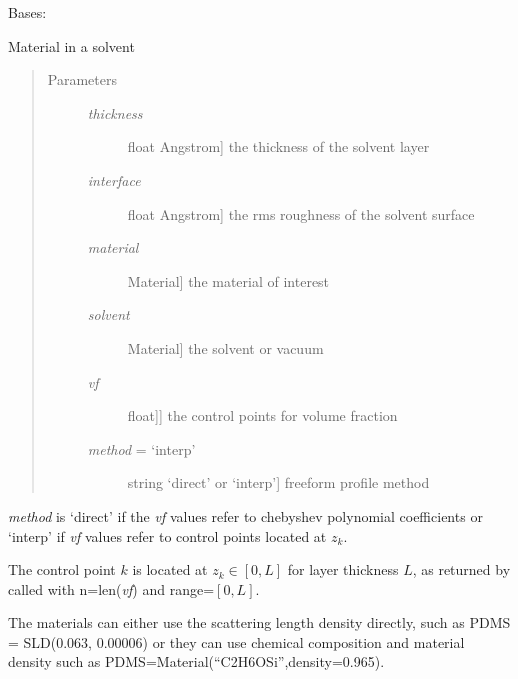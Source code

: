 \documentclass[letterpaper,10pt,english]{sphinxmanual}
\begin{document}
\begin{fulllineitems}
\label{api/cheby:refl1d.cheby.ChebyVF}
Bases: {\hyperref[api/model:refl1d.model.Layer]{}}

Material in a solvent
\begin{quote}\begin{description}
\item[{Parameters }] \leavevmode\begin{description}
\item[{\emph{thickness}}] \leavevmode{[}float \textbar{} Angstrom{]}
the thickness of the solvent layer

\item[{\emph{interface}}] \leavevmode{[}float \textbar{} Angstrom{]}
the rms roughness of the solvent surface

\item[{\emph{material}}] \leavevmode{[}Material{]}
the material of interest

\item[{\emph{solvent}}] \leavevmode{[}Material{]}
the solvent or vacuum

\item[{\emph{vf}}] \leavevmode{[}{[}float{]}{]}
the control points for volume fraction

\item[{\emph{method} = `interp'}] \leavevmode{[}string \textbar{} `direct' or `interp'{]}
freeform profile method

\end{description}

\end{description}\end{quote}

\emph{method} is `direct' if the \emph{vf} values refer to chebyshev
polynomial coefficients or `interp' if \emph{vf} values refer to
control points located at $z_k$.

The control point $k$ is located at $z_k \in [0,L]$ for layer
thickness $L$, as returned by {\hyperref[api/cheby:refl1d.cheby.cheby_points]{}} called with
n=len(\emph{vf}) and range=$[0,L]$.

The materials can either use the scattering length density directly,
such as PDMS = SLD(0.063, 0.00006) or they can use chemical composition
and material density such as PDMS=Material(``C2H6OSi'',density=0.965).


\end{fulllineitems}
\end{document}
